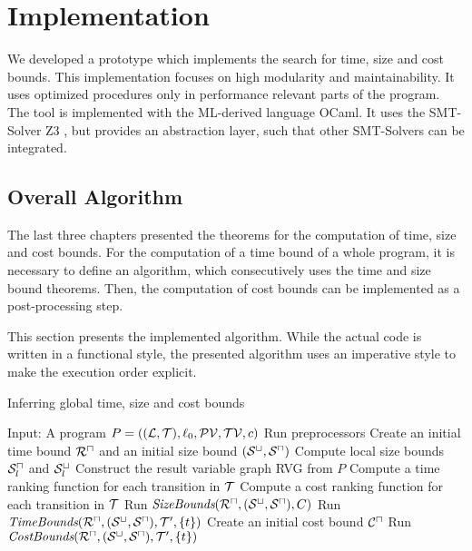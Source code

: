 \chapter{Implementation}

We developed a prototype which implements the search for time, size and cost bounds.
This implementation focuses on high modularity and maintainability.
It uses optimized procedures only in performance relevant parts of the program.
The tool is implemented with the ML-derived language OCaml.
It uses the SMT-Solver Z3 \cite{z3}, but provides an abstraction layer, such that other SMT-Solvers can be integrated.

\section{Overall Algorithm}

The last three chapters presented the theorems for the computation of time, size and cost bounds.
For the computation of a time bound of a whole program, it is necessary to define an algorithm, which consecutively uses the time and size bound theorems.
Then, the computation of cost bounds can be implemented as a post-processing step.

This section presents the implemented algorithm.
While the actual code is written in a functional style, the presented algorithm uses an imperative style to make the execution order explicit.

\begin{algorithm}
\caption{Inferring global time, size and cost bounds}\label{complete_algorithm}
\begin{algorithmic}[1]
  \State Input: A program $P = ((\mathcal{L}, \mathcal{T}),\ell_0,\mathcal{PV},\mathcal{TV},c)$
  \State Run preprocessors
  \State Create an initial time bound ${\mathcal{R}^\sqcap}$ and an initial size bound ${({\mathcal{S}^\sqcup}, {\mathcal{S}^\sqcap})}$
  \State Compute local size bounds ${\mathcal{S}^\sqcap_l}$ and ${\mathcal{S}^\sqcup_l}$
  \State Construct the result variable graph RVG from $P$
  \State Compute a time ranking function for each transition in $\mathcal{T}$
  \State Compute a cost ranking function for each transition in $\mathcal{T}$
  \Repeat
      \State Run $\emph{SizeBounds}({\mathcal{R}^\sqcap}, {({\mathcal{S}^\sqcup}, {\mathcal{S}^\sqcap})}, C)$
    \EndFor
        \State Run $\emph{TimeBounds}({\mathcal{R}^\sqcap}, {({\mathcal{S}^\sqcup}, {\mathcal{S}^\sqcap})}, \mathcal{T}', \lbrace t \rbrace)$
      \EndFor
    \EndFor
  \State Create an initial cost bound ${\mathcal{C}^\sqcap}$
    \State Run $\emph{CostBounds}({\mathcal{R}^\sqcap}, {({\mathcal{S}^\sqcup}, {\mathcal{S}^\sqcap})}, \mathcal{T}', \lbrace t \rbrace)$
  \EndFor
\end{algorithmic}
\end{algorithm}

